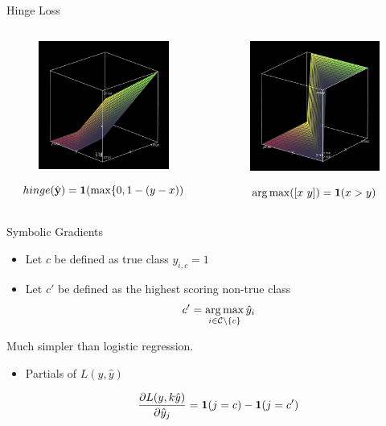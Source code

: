 \documentclass{beamer}
\begin{document}
\begin{frame}{Hinge Loss}
  \begin{columns}[t]
    \begin{column}[t]{0.5\textwidth}


      \begin{figure}
        \centering
        \includegraphics[width=5cm]{hinge}

      \end{figure}
      \[hinge(\hat{\mathbf{y}}) = \mathbf{1}(\max\{0, 1 - (y - x)) \]
    \end{column}

    \begin{column}[t]{0.5\textwidth}


      \begin{figure}
        \centering
      \includegraphics[width=5cm]{argmax}
      \end{figure}
      \[\argmax([x\ y]) = \indicator(x > y) \]      
    \end{column}
  \end{columns}
\end{frame}  


\begin{frame}{Symbolic Gradients}

  \begin{itemize}
  \item   Let $c$ be defined as true class $y_{i, c} = 1$  
  \item   Let $c'$ be defined as the highest scoring non-true class 
    \[c' = \argmax_{i \in \mcC \setminus\{c\}} \hat{y}_i \] 
  \end{itemize}
  
  Much simpler than logistic regression.

  \begin{itemize}
  \item Partials of $L(y, \hat{y})$

  \[ \frac{\partial L(y,k \hat{y})}{\partial \hat{y}_j} = \mathbf{1}(j = c) - \mathbf{1}(j = c')  \]

   \end{itemize}
\end{frame}
\end{document}
